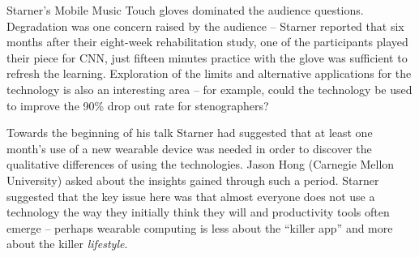 Starner's Mobile Music Touch gloves dominated the audience questions.
Degradation was one concern raised by the audience -- Starner reported that six
months after their eight-week rehabilitation study, one of the participants
played their piece for CNN, just fifteen minutes practice with the glove was
sufficient to refresh the learning. Exploration of the limits and alternative
applications for the technology is also an interesting area -- for example,
could the technology be used to improve the 90\% drop out rate for
stenographers?

Towards the beginning of his talk Starner had suggested that at least one
month's use of a new wearable device was needed in order to discover the
qualitative differences of using the technologies. Jason Hong (Carnegie
Mellon University) asked about the insights gained through such a period.
Starner suggested that the key issue here was that almost everyone does not 
use a technology the way they initially think they will and productivity tools
often emerge -- perhaps wearable computing is less about the ``killer app'' and
more about the killer \emph{lifestyle}.